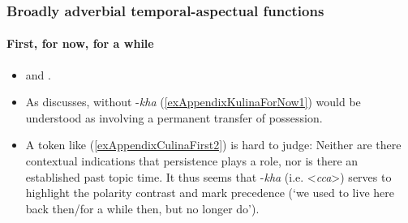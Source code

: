 \subsubsection{Broadly adverbial temporal-aspectual functions}
\paragraph{First, for now, for a while}
\label{appendixKulinaFirst}
\begin{itemize}
	\item \textcite[183–184]{Tiss2004} and \textcite[34]{MonserratSilva1986}.
	\item As \textcite[184]{Tiss2004} discusses, without \mbox{-\textit{kha}} (\ref{exAppendixKulinaForNow1}) would be understood as involving a permanent transfer of possession.
	\item A token like (\ref{exAppendixCulinaFirst2}) is hard to judge: Neither are there contextual indications that persistence plays a role, nor is there an established past topic time. It thus seems that  \mbox{-\textit{kha}} (i.e. <\textit{cca}>) serves to highlight the polarity contrast and mark precedence (\lq we used to live here back then/for a while then, but no longer do'). 
\end{itemize}

